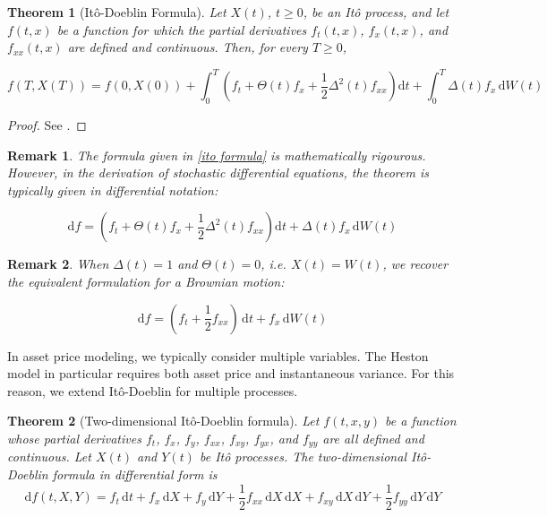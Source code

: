 \documentclass[11pt, a4paper]{article}
\newtheorem{theorem}{Theorem}
\newtheorem{remark}{Remark}
\numberwithin{equation}{subsection}
\numberwithin{definition}{subsection}
\numberwithin{theorem}{subsection}
\numberwithin{remark}{subsection}
\begin{document}
\begin{theorem}[It\^{o}-Doeblin Formula]
    Let \(X(t)\), \(t \geq 0\), be an It\^{o} process, and let \(f(t, x)\) be a function for which the partial derivatives \(f_t(t, x)\), \(f_x(t, x)\), and \(f_{xx}(t, x)\) are defined and continuous. Then, for every \(T \geq 0\),

    \begin{equation}
        f(T, X(T)) = f(0, X(0)) 
        + \int_0^T \left(f_t + \Theta(t) f_x + \frac{1}{2}\Delta^2(t) f_{xx}\right)\mathrm{d}t 
        + \int_0^T \Delta(t) f_x \, \mathrm{d}W(t)
        \label{ito formula}
    \end{equation}  
\end{theorem}

\begin{proof}
    See \cite[p.~146]{shreve2004}.
\end{proof}

\begin{remark}
    The formula given in \eqref{ito formula} is mathematically rigourous. However, in the derivation of stochastic differential equations, the theorem is typically given in differential notation:

    \begin{equation}
        \mathrm{d}f = \left(f_t + \Theta(t) f_x + \frac{1}{2}\Delta^2(t) f_{xx}\right)\mathrm{d}t 
        + \Delta(t) f_x \, \mathrm{d}W(t)
    \end{equation}
    
\end{remark}

\begin{remark}
    When \(\Delta(t) = 1\) and \(\Theta(t) = 0\), i.e. \(X(t) = W(t)\), we recover the equivalent formulation for a Brownian motion:

    \begin{equation}
        \mathrm{d}f = \left( f_t + \frac{1}{2}f_{xx} \right) \, \mathrm{d}t  + f_x \, \mathrm{d}W(t)
    \end{equation}
    
\end{remark}

In asset price modeling, we typically consider multiple variables. The Heston model in particular requires both asset price and instantaneous variance. For this reason, we extend It\^{o}-Doeblin for multiple processes.

\begin{theorem}[Two-dimensional It\^{o}-Doeblin formula]
    Let \(f(t, x, y)\) be a function whose partial derivatives \(f_t\), \(f_x\), \(f_y\), \(f_{xx}\), \(f_{xy}\), \(f_{yx}\), and \(f_{yy}\) are all defined and continuous. Let \(X(t)\) and \(Y(t)\) be It\^{o} processes. The two-dimensional \textup{It\^{o}-Doeblin formula in differential form} is
    \begin{equation}
        \mathrm{d}f(t, X, Y) = f_t \, \mathrm{d}t + f_x \, \mathrm{d}X + f_y \, \mathrm{d}Y + \frac{1}{2} f_{xx} \, \mathrm{d}X \, \mathrm{d}X + f_{xy} \, \mathrm{d}X \, \mathrm{d}Y + \frac{1}{2} f_{yy} \, \mathrm{d}Y \, \mathrm{d}Y
    \end{equation}
\end{theorem}
\end{document}
